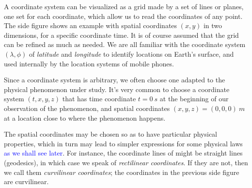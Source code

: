 \documentclass[a4paper,12pt,%
onecolumn,oneside,%
british%
]{memoir}
\renewcommand*{\|}[1][]{\nonscript\:#1\vert\nonscript\:\mathopen{}}
\newcommand*{\sect}{\S}%
\renewcommand*{\autoref}[2]{\sidepar{\vspace{-1ex}\footnotesize{\color{blue}\faIcon{%
angle-right%
}\enspace\sect~\ref{#1} page~\pageref{#1}}}\textcolor{blue}{#2}}
\begin{document}
%
%
A coordinate system can be visualized as a grid made by a set of lines or planes, one set for each coordinate, which allow us to read the coordinates of any point. The side figure shows an example with spatial coordinates $(x,y)$ in two dimensions, for a specific coordinate time. It is of course assumed that the grid can be refined as much as needed. We are all familiar with the coordinate system $(\lambda, \phi)$ of \emph{latitude} and \emph{longitude} to identify locations on Earth's surface, and used internally by the location systems of mobile phones.

Since a coordinate system is arbitrary, we often choose one adapted to the physical phenomenon under study. It's very common to choose a coordinate system $(t,x,y,z)$ that has time coordinate $t=\qty{0}{s}$ at the beginning of our observation of the phenomenon, and spatial coordinates $(x,y,z)=(0,0,0)\:\unit{m}$ at a location close to where the phenomenon happens.

\medskip

The spatial coordinates may be chosen so as to have particular physical properties, which in turn may lead to simpler expressions for some physical laws \autoref{sec:constitutive}{as we shall see later}. For instance, the coordinate lines of might be straight lines (geodesics), in which case we speak of \emph{rectilinear coordinates}. If they are not, then we call them \emph{curvilinear coordinates}; the coordinates in the previous side figure are curvilinear.
\end{document}
